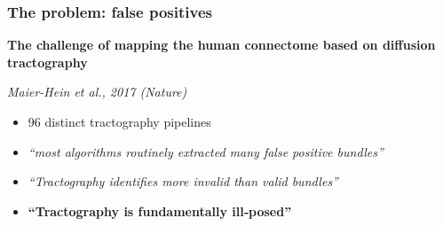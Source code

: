 \documentclass[aspectratio=169]{beamer}
\begin{document}
		\begin{frame}
		\frametitle{The problem: false positives}
		\begin{center}
		\textbf{The challenge of mapping the human connectome based on diffusion tractography}
		\end{center}
		\begin{flushright}
		\emph{Maier-Hein et al., 2017 (Nature)}
		\end{flushright}
		
		\begin{itemize}
		\item 96 distinct tractography pipelines
		\item \emph{``most algorithms routinely extracted many false positive bundles''}
		\item \emph{``Tractography identifies more invalid than valid bundles''}
		\item \textbf{``Tractography is fundamentally ill‐posed''}
		\end{itemize}
		\end{frame}
		
\end{document}
